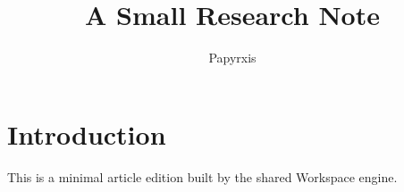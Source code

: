 \documentclass[11pt]{article}
\title{A Small Research Note}
\author{Papyrxis}
\begin{document}
\maketitle
\section{Introduction}
This is a minimal article edition built by the shared Workspace engine.
\end{document}
